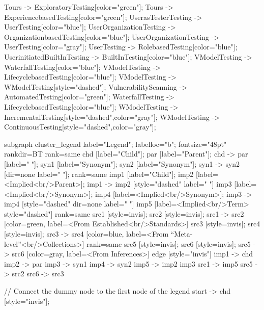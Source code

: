 \documentclass{article}
\begin{document}
{Tours -> ExploratoryTesting[color="green"];
Tours -> ExperiencebasedTesting[color="green"];
UserasTesterTesting -> UserTesting[color="blue"];
UserOrganizationTesting -> OrganizationbasedTesting[color="blue"];
UserOrganizationTesting -> UserTesting[color="gray"];
UserTesting -> RolebasedTesting[color="blue"];
UserinitiatedBuiltInTesting -> BuiltInTesting[color="blue"];
VModelTesting -> WaterfallTesting[color="blue"];
VModelTesting -> LifecyclebasedTesting[color="blue"];
VModelTesting -> WModelTesting[style="dashed"];
VulnerabilityScanning -> AutomatedTesting[color="green"];
WaterfallTesting -> LifecyclebasedTesting[color="blue"];
WModelTesting -> IncrementalTesting[style="dashed",color="gray"];
WModelTesting -> ContinuousTesting[style="dashed",color="gray"];

subgraph cluster_legend {
    label="Legend";
    labelloc="b";
    fontsize="48pt"
    rankdir=BT
    {
        rank=same
        chd [label="Child"];
        par [label="Parent"];
        chd -> par [label="                "];
        syn1 [label="Synonym"];
        syn2 [label="Synonym"];
        syn1 -> syn2 [dir=none label="                "];
    }
    {
        rank=same
        imp1 [label="Child"];
        imp2 [label=<Implied<br/>Parent>];
        imp1 -> imp2 [style="dashed" label="                "]
        imp3 [label=<Implied<br/>Synonym>];
        imp4 [label=<Implied<br/>Synonym>];
        imp3 -> imp4 [style="dashed" dir=none label="                "]
    }
        imp5 [label=<Implied<br/>Term> style="dashed"]
{
rank=same
src1 [style=invis];
src2 [style=invis];
src1 -> src2 [color=green, label=<From Established<br/>Standards>]
src3 [style=invis];
src4 [style=invis];
src3 -> src4 [color=blue, label=<From ``Meta-level''<br/>Collections>]
}
{
rank=same
src5 [style=invis];
src6 [style=invis];
src5 -> src6 [color=gray, label=<From Inferences>]
}
    edge [style="invis"]
    imp1 -> chd
    imp2 -> par
    imp3 -> syn1
    imp4 -> syn2
imp5 -> { imp2 imp3 }
src1 -> imp5
src5 -> src2
src6 -> src3
}

// Connect the dummy node to the first node of the legend
start -> chd [style="invis"];
}
\end{document}
